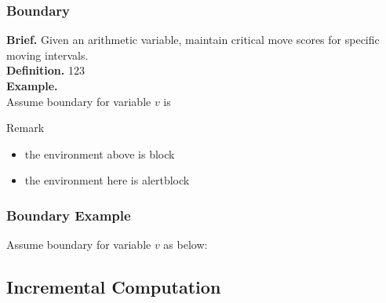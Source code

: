 \begin{frame} 
    \frametitle{Boundary}

    \textbf{Brief. }Given an arithmetic variable, maintain critical move scores for specific moving intervals.
    \\
    \textbf{Definition. } 123
    \\
    \textbf{Example. }\\
    Assume boundary for variable $v$ is

    
    \begin{alertblock}{Remark}
        \begin{itemize}
            \item the environment above is \alert{block}
            \item the environment here is \alert{alertblock}
        \end{itemize}
    \end{alertblock}
\end{frame}

\begin{frame}
    \frametitle{Boundary Example}
    Assume boundary for variable $v$ as below:\\
    \vspace{1cm}
\end{frame}

\subsection{Incremental Computation}

